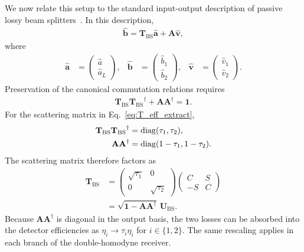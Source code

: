 \documentclass[%
final, 
superscriptaddress,
 amsmath,amssymb,amsfonts,
 aps,
 pra,
 longbibliography,
]{revtex4-2}
\newcommand{\hcnj}[1]{{#1}^{\dagger}}
\newcommand{\diag}{\mathop{\rm diag}\nolimits}
\newcommand{\vc}[1]{\mathbf{#1}}
\newcommand{\ind}[1]{\mathrm{#1}}
\begin{document}
We now relate this setup to the standard input-output description of passive lossy beam splitters~\cite{Barnett1998,Knll1999}. In this description,
\begin{align}
  \hat{\boldsymbol b}
  =
  \vc{T}_{\ind{BS}}\hat{\boldsymbol a}
  +
  \vc{A}\hat{\boldsymbol v},
\end{align}
where
\begin{align}
  \hat{\boldsymbol a}
  &=
  \begin{pmatrix}
    \hat a\\
    \hat a_L
  \end{pmatrix},
  &
  \hat{\boldsymbol b}
  &=
  \begin{pmatrix}
    \hat b_1\\
    \hat b_2
  \end{pmatrix},
  &
  \hat{\boldsymbol v}
  &=
  \begin{pmatrix}
    \hat v_1\\
    \hat v_2
  \end{pmatrix}.
\end{align}
Preservation of the canonical commutation relations requires
\begin{align}
  \vc{T}_{\ind{BS}}
  \hcnj{\vc{T}_{\ind{BS}}}
  +
  \vc{A}
  \hcnj{\vc{A}}
  =
  \vc{1}.
\end{align}
For the scattering matrix in Eq.~\eqref{eq:T_eff_extract},
\begin{align}
  \vc{T}_{\ind{BS}}
  \hcnj{\vc{T}_{\ind{BS}}}
  &=
  \diag(\tau_1,\tau_2),
  \\
  \vc{A}
  \hcnj{\vc{A}}
  &=
  \diag(1-\tau_1,1-\tau_2).
\end{align}
The scattering matrix therefore factors as
\begin{align}
    \label{eq:R_eff}
    \vc{T}_{\ind{BS}}
    &=
    \begin{pmatrix}
        \sqrt{\tau_1} & 0\\
        0 & \sqrt{\tau_2}
    \end{pmatrix}
    \begin{pmatrix}
        C & S\\
        -S & C
    \end{pmatrix}
    \nonumber\\
    &=
    \sqrt{
      \vc{1}
      -
      \vc{A}\hcnj{\vc{A}}
    }\,
    \vc{U}_{\ind{BS}}.
\end{align}
Because
$\vc{A}\hcnj{\vc{A}}$
is diagonal in the output basis, the two losses can be absorbed into the detector efficiencies as
$\eta_i\to\tau_i\eta_i$
for
$i\in\{1,2\}$.
The same rescaling applies in each branch of the double-homodyne receiver.
\end{document}
